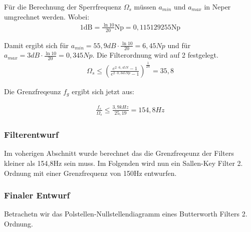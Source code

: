 Für die Berechnung der Sperrfrequenz $\Omega_s$ müssen  $a_{min}$ und $a_{max}$ in Neper umgrechnet werden. Wobei:
\begin{align*}
1 \text{dB} =  \frac{\ln{10}}{20}\text{Np} = 0,115129255 \text{Np}   
\end{align*}

Damit ergibt sich für $a_{min}=55,9 dB\cdot \frac{\ln{10}}{20}=6,45Np$ und für  $a_{max}=3 dB\cdot \frac{\ln{10}}{20}=0,345Np$. Die Filterordnung wird auf 2 festgelegt.
\begin{align}
\Omega_s \le  \left(\frac{e^{2\cdot6,45N }-1}{e^{2\cdot 0,345Np}-1}\right)^{\frac{1}{2n}}  = 35,8
\end{align}

Die Grenzfreqeunz $f_g$ ergibt sich jetzt aus:

\begin{align}
\frac{f_s}{\Omega_s} \le \frac{3,9kHz}{25,19} = 154,8Hz
\end{align}

\subsubsection{Filterentwurf}
Im voherigen Abschnitt wurde berechnet das die Grenzfreqeunz der Filters kleiner als 154,8Hz sein muss.
Im Folgenden wird nun ein Sallen-Key Filter 2. Ordnung mit einer Grenzfrequenz von 150Hz entwurfen.


\subsubsection{Finaler Entwurf}



Betrachetn wir das Polstellen-Nullstellendiagramm eines Butterworth Filters 2. Ordnung.



